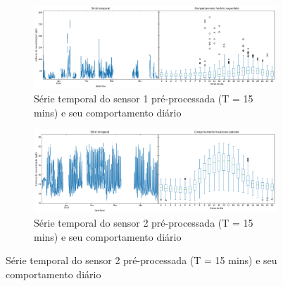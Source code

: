 \begin{figure}[h]
    \centering
    \caption{Séries temporais dos sensores OX-B431 pré-processadas}
    \begin{subfigure}{0.95\textwidth}
        \includegraphics[width=\textwidth]{chapters/3-RESULTADOS CAMPO/Figuras/preproc-ox-b4-1.png}
        \caption{Série temporal do sensor 1 pré-processada (T = 15 mins) e seu comportamento diário}
        \label{fig:data-o3-1-preproc-15}
    \end{subfigure}
    \begin{subfigure}{0.95\textwidth}
        \includegraphics[width=\textwidth]{chapters/3-RESULTADOS CAMPO/Figuras/preproc-ox-b4-2.png}
        \caption{Série temporal do sensor 2 pré-processada (T = 15 mins) e seu comportamento diário}
        \label{fig:data-o3-2-preproc-15}
    \end{subfigure}
    \label{fig:data-o3-preproc-15}
\end{figure}

